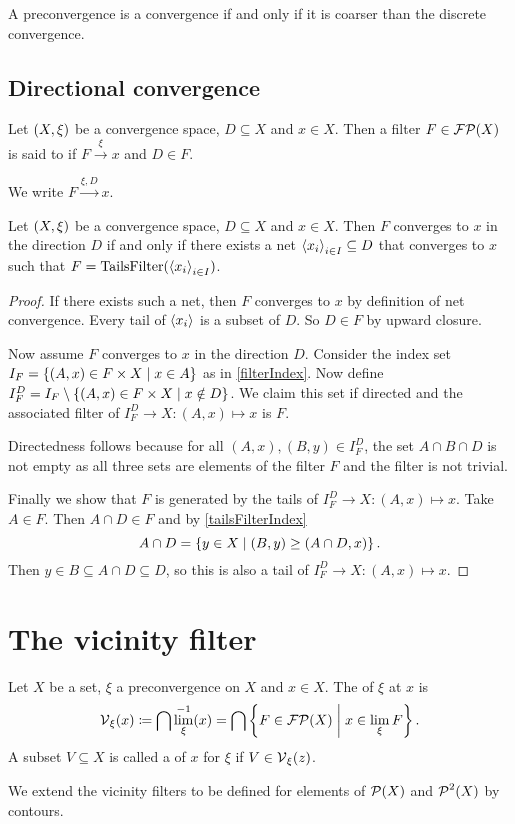 \begin{lemma}
A preconvergence is a convergence \textup{if and only if} it is coarser than the discrete convergence.
\end{lemma}

\subsection{Directional convergence}
\begin{definition}
Let $\left( X,\xi \right)$ be a convergence space, $D\subseteq X$ and $x\in X$. Then a filter $F\in \operatorname{\mathcal{FP}}(X)$ is said to  if $F\overset{\xi}{\longrightarrow} x$ and $D\in F$.

We write $F\overset{\xi, D}{\longrightarrow} x$.
\end{definition}

\begin{lemma}
Let $\left( X,\xi \right)$ be a convergence space, $D\subseteq X$ and $x\in X$. Then $F$ converges to $x$ in the direction $D$ \textup{if and only if} there exists a net $\left\langle x_i \right\rangle_{i\in I}\subseteq D$ that converges to $x$ such that $F = \operatorname{TailsFilter}(\left\langle x_i \right\rangle_{i\in I})$.
\end{lemma}
\begin{proof}
If there exists such a net, then $F$ converges to $x$ by definition of net convergence. Every tail of $\left\langle x_i \right\rangle$ is a subset of $D$. So $D\in F$ by upward closure.

Now assume $F$ converges to $x$ in the direction $D$. Consider the index set $I_F = \left\{ (A,x)\in F\times X \;\middle|\; x\in A \right\}$ as in \ref{filterIndex}. Now define $I_F^D = I_F\setminus\left\{ (A,x)\in F\times X \;\middle|\; x\notin D \right\}$. We claim this set if directed and the associated filter of $I_F^D \to X: (A,x) \mapsto x$ is $F$.

Directedness follows because for all $(A,x), (B,y)\in I_F^D$, the set $A\cap B\cap D$ is not empty as all three sets are elements of the filter $F$ and the filter is not trivial.

Finally we show that $F$ is generated by the tails of $I_F^D \to X: (A,x) \mapsto x$. Take $A\in F$. Then $A\cap D\in F$ and by \ref{tailsFilterIndex}
\[ A\cap D = \left\{ y\in X \;\middle|\; (B,y) \geq (A\cap D,x) \right\}. \]
Then $y\in B\subseteq A\cap D \subseteq D$, so this is also a tail of $I_F^D \to X: (A,x) \mapsto x$.
\end{proof}


\section{The vicinity filter}
\begin{definition}
Let $X$ be a set, $\xi$ a preconvergence on $X$ and $x\in X$. The  of $\xi$ at $x$ is
\[ \operatorname{\mathcal{V}}_\xi(x) \coloneqq \bigcap \lim_\xi^{-1}(x) = \bigcap \left\{ F\in \operatorname{\mathcal{FP}}(X) \;\middle|\; x\in \lim_\xi F \right\}. \]
A subset $V\subseteq X$ is called a  of $x$ for $\xi$ if $V\in \operatorname{\mathcal{V}}_\xi(z)$.

We extend the vicinity filters to be defined for elements of $\operatorname{\mathcal{P}}(X)$ and $\operatorname{\mathcal{P}}^2(X)$ by contours.
\end{definition}

